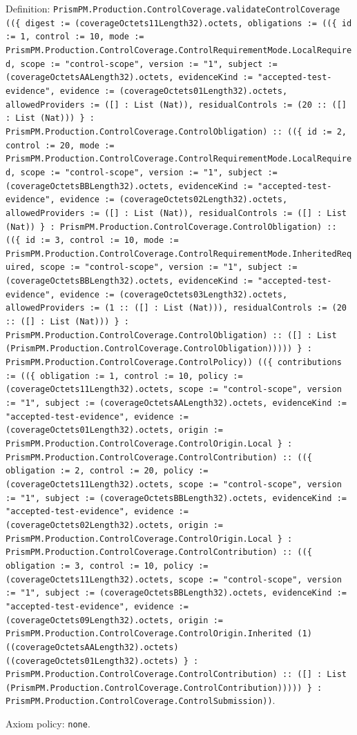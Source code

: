\documentclass[11pt]{article}
\begin{document}
\noindent Definition: \texttt{PrismPM.Production.ControlCoverage.validateControlCoverage ((\{ digest := (coverageOctets11Length32).octets, obligations := ((\{ id := 1, control := 10, mode := PrismPM.Production.ControlCoverage.ControlRequirementMode.LocalRequired, scope := "control-scope", version := "1", subject := (coverageOctetsAALength32).octets, evidenceKind := "accepted-test-evidence", evidence := (coverageOctets01Length32).octets, allowedProviders := ([] : List (Nat)), residualControls := (20 :: ([] : List (Nat))) \} : PrismPM.Production.ControlCoverage.ControlObligation) :: ((\{ id := 2, control := 20, mode := PrismPM.Production.ControlCoverage.ControlRequirementMode.LocalRequired, scope := "control-scope", version := "1", subject := (coverageOctetsBBLength32).octets, evidenceKind := "accepted-test-evidence", evidence := (coverageOctets02Length32).octets, allowedProviders := ([] : List (Nat)), residualControls := ([] : List (Nat)) \} : PrismPM.Production.ControlCoverage.ControlObligation) :: ((\{ id := 3, control := 10, mode := PrismPM.Production.ControlCoverage.ControlRequirementMode.InheritedRequired, scope := "control-scope", version := "1", subject := (coverageOctetsBBLength32).octets, evidenceKind := "accepted-test-evidence", evidence := (coverageOctets03Length32).octets, allowedProviders := (1 :: ([] : List (Nat))), residualControls := (20 :: ([] : List (Nat))) \} : PrismPM.Production.ControlCoverage.ControlObligation) :: ([] : List (PrismPM.Production.ControlCoverage.ControlObligation))))) \} : PrismPM.Production.ControlCoverage.ControlPolicy)) ((\{ contributions := ((\{ obligation := 1, control := 10, policy := (coverageOctets11Length32).octets, scope := "control-scope", version := "1", subject := (coverageOctetsAALength32).octets, evidenceKind := "accepted-test-evidence", evidence := (coverageOctets01Length32).octets, origin := PrismPM.Production.ControlCoverage.ControlOrigin.Local \} : PrismPM.Production.ControlCoverage.ControlContribution) :: ((\{ obligation := 2, control := 20, policy := (coverageOctets11Length32).octets, scope := "control-scope", version := "1", subject := (coverageOctetsBBLength32).octets, evidenceKind := "accepted-test-evidence", evidence := (coverageOctets02Length32).octets, origin := PrismPM.Production.ControlCoverage.ControlOrigin.Local \} : PrismPM.Production.ControlCoverage.ControlContribution) :: ((\{ obligation := 3, control := 10, policy := (coverageOctets11Length32).octets, scope := "control-scope", version := "1", subject := (coverageOctetsBBLength32).octets, evidenceKind := "accepted-test-evidence", evidence := (coverageOctets09Length32).octets, origin := PrismPM.Production.ControlCoverage.ControlOrigin.Inherited (1) ((coverageOctetsAALength32).octets) ((coverageOctets01Length32).octets) \} : PrismPM.Production.ControlCoverage.ControlContribution) :: ([] : List (PrismPM.Production.ControlCoverage.ControlContribution))))) \} : PrismPM.Production.ControlCoverage.ControlSubmission))}.\par
\noindent Axiom policy: \texttt{none}.\par
\end{document}
